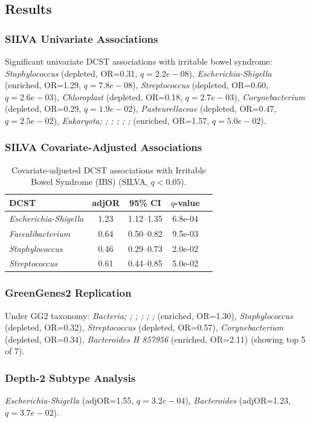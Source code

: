 \documentclass[11pt,a4paper]{article}
\begin{document}
\subsection{Results}
\subsubsection{SILVA Univariate Associations}
Significant univariate DCST associations with irritable bowel syndrome: \textit{Staphylococcus} (depleted, OR=0.31, $q=2.2e-08$), \textit{Escherichia-Shigella} (enriched, OR=1.29, $q=7.8e-08$), \textit{Streptococcus} (depleted, OR=0.60, $q=2.6e-03$), \textit{Chloroplast} (depleted, OR=0.18, $q=2.7e-03$), \textit{Corynebacterium} (depleted, OR=0.29, $q=1.9e-02$), \textit{Pasteurellaceae} (depleted, OR=0.47, $q=2.5e-02$), \textit{Eukaryota;  ;  ;  ;  ;  ;  } (enriched, OR=1.57, $q=5.0e-02$).

\subsubsection{SILVA Covariate-Adjusted Associations}
\begin{table}[H]\centering\small
\caption{Covariate-adjusted DCST associations with Irritable Bowel Syndrome (IBS) (SILVA, $q<0.05$).}\label{tab:IBS_adj}
\begin{tabular}{lcccc}
\toprule
DCST & adjOR & 95\% CI & $q$-value \\
\midrule
\textit{Escherichia-Shigella} & 1.23 & 1.12--1.35 & 6.8e-04 \\
\textit{Faecalibacterium} & 0.64 & 0.50--0.82 & 9.5e-03 \\
\textit{Staphylococcus} & 0.46 & 0.29--0.73 & 2.0e-02 \\
\textit{Streptococcus} & 0.61 & 0.44--0.85 & 5.0e-02 \\
\bottomrule
\end{tabular}\end{table}

\subsubsection{GreenGenes2 Replication}
Under GG2 taxonomy: \textit{Bacteria;  ;  ;  ;  ;  ;  } (enriched, OR=1.30), \textit{Staphylococcus} (depleted, OR=0.32), \textit{Streptococcus} (depleted, OR=0.57), \textit{Corynebacterium} (depleted, OR=0.34), \textit{Bacteroides H 857956} (enriched, OR=2.11) (showing top 5 of 7).

\subsubsection{Depth-2 Subtype Analysis}
\textit{Escherichia-Shigella} (adjOR=1.55, $q=3.2e-04$), \textit{Bacteroides} (adjOR=1.23, $q=3.7e-02$).
\end{document}
